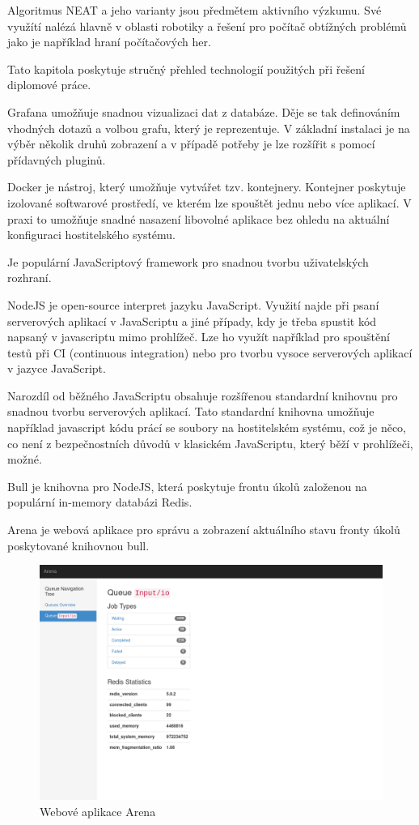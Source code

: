 Algoritmus NEAT a jeho varianty jsou předmětem aktivního výzkumu. Své využítí nalézá hlavně v oblasti robotiky a řešení pro počítač obtížných problémů jako je například hraní počítačových her.
 
Tato kapitola poskytuje stručný přehled technologií použitých při řešení diplomové práce.

\label{sec:grafana}
Grafana umožňuje snadnou vizualizaci dat z databáze. Děje se tak definováním vhodných dotazů a volbou grafu, který je reprezentuje. V základní instalaci je na výběr několik druhů zobrazení a v případě potřeby je lze rozšířit s pomocí přídavných pluginů.

Docker je nástroj, který umožňuje vytvářet tzv. kontejnery. Kontejner poskytuje izolované softwarové prostředí, ve kterém lze spouštět jednu nebo více aplikací. 
V praxi to umožňuje snadné nasazení libovolné aplikace bez ohledu na aktuální konfiguraci hostitelského systému.

Je populární JavaScriptový framework pro snadnou tvorbu uživatelských rozhraní.

NodeJS je open-source interpret jazyku JavaScript. Využití najde při psaní serverových aplikací v JavaScriptu a jiné případy, kdy je třeba spustit kód napsaný v javascriptu mimo prohlížeč. Lze ho využít například pro spouštění testů při CI (continuous integration) nebo pro tvorbu vysoce serverových aplikací v jazyce JavaScript.

Narozdíl od běžného JavaScriptu obsahuje rozšířenou standardní knihovnu pro snadnou tvorbu serverových aplikací. Tato standardní knihovna umožňuje například javascript kódu prácí se soubory na hostitelském systému, což je něco, co není z bezpečnostních důvodů v klasickém JavaScriptu, který běží v prohlížeči, možné.

Bull je knihovna pro NodeJS, která poskytuje frontu úkolů založenou na populární in-memory databázi Redis.

Arena je webová aplikace pro správu a zobrazení aktuálního stavu fronty úkolů poskytované knihovnou bull.

\begin{figure}[H]
	\centering
	\includegraphics[width=0.7\linewidth]{bull}
	\caption{Webové aplikace Arena}
	\label{fig:bull}
\end{figure}

